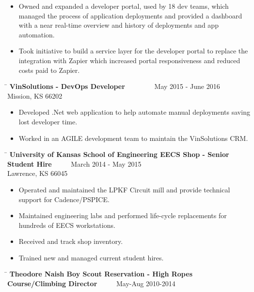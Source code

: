 \documentclass{res}
\begin{document}
\begin{resume}
\begin{itemize}
		\item Owned and expanded a developer portal, used by 18 dev teams, which managed the process of application deployments and provided a dashboard with a near real-time overview and history of deployments and app automation.
		\item Took initiative to build a service layer for the developer portal to replace the integration with Zapier which increased portal responsiveness and reduced costs paid to Zapier. \vspace{-15pt}
	\end{itemize}
   \begin{tabbing}
	\hspace{5.5in}\= \kill 
	{\bf VinSolutions - DevOps Developer} \>~~~~~~~~May 2015 - June 2016\\
	Mission, KS 66202
	\end{tabbing}\vspace{-9pt}
	\begin{itemize}
		\item Developed .Net web application to help automate manual deployments saving lost developer time.
		\item Worked in an AGILE development team to maintain the VinSolutions CRM.\vspace{-15pt}
	\end{itemize}
   \begin{tabbing}
   \hspace{5.5in}\= \kill
   {\bf University of Kansas School of Engineering EECS Shop - Senior Student Hire}  \>~~~~~March 2014 - May 2015\\
   Lawrence, KS 66045
   \end{tabbing}\vspace{-9pt}
	\begin{itemize}
		\item Operated and maintained the LPKF Circuit mill and provide technical support for Cadence/PSPICE.
		\item Maintained engineering labs and performed life-cycle replacements for hundreds of EECS workstations.
		\item Received and track shop inventory.
		\item Trained new and managed current student hires.\vspace{-15pt}
	\end{itemize}
   \begin{tabbing}
	\hspace{5.5in}\= \kill
	{\bf Theodore Naish Boy Scout Reservation - High Ropes Course/Climbing Director}  \>~~~~~May-Aug 2010-2014\\

\end{tabbing}
\end{resume}
\end{document}

